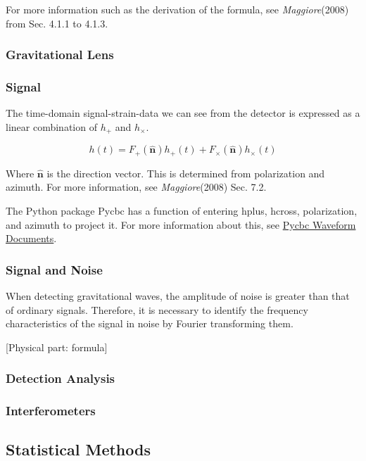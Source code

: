 For more information such as the derivation of the formula, see \textit{Maggiore}(2008) from Sec. 4.1.1 to 4.1.3.

\subsubsection{Gravitational Lens}

\subsubsection{Signal}

The time-domain signal-strain-data we can see from the detector is expressed as a linear combination of $h_+$ and $h_\times$.

\begin{equation}
    h(t) = F_+(\hat{\mathbf{n}}) h_+(t) + F_\times (\hat{\mathbf{n}}) h_\times (t)
\end{equation}

Where $\hat{\mathbf{n}}$ is the direction vector. This is determined from polarization and azimuth. For more information, see \textit{Maggiore}(2008) Sec. 7.2.

The Python package Pycbc has a function of entering hplus, hcross, polarization, and azimuth to project it. For more information about this, see \href{https://pycbc.org/pycbc/latest/html/waveform.html}{Pycbc Waveform Documents}.

\subsubsection{Signal and Noise}

When detecting gravitational waves, the amplitude of noise is greater than that of ordinary signals. Therefore, it is necessary to identify the frequency characteristics of the signal in noise by Fourier transforming them.

[Physical part: formula]

\subsubsection{Detection Analysis}

\subsubsection{Interferometers}

\subsection{Statistical Methods}

